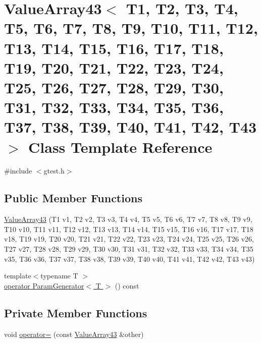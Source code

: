 \hypertarget{classtesting_1_1internal_1_1ValueArray43}{\section{\-Value\-Array43$<$ \-T1, \-T2, \-T3, \-T4, \-T5, \-T6, \-T7, \-T8, \-T9, \-T10, \-T11, \-T12, \-T13, \-T14, \-T15, \-T16, \-T17, \-T18, \-T19, \-T20, \-T21, \-T22, \-T23, \-T24, \-T25, \-T26, \-T27, \-T28, \-T29, \-T30, \-T31, \-T32, \-T33, \-T34, \-T35, \-T36, \-T37, \-T38, \-T39, \-T40, \-T41, \-T42, \-T43 $>$ \-Class \-Template \-Reference}
\label{d3/d15/classtesting_1_1internal_1_1ValueArray43}
}


{\ttfamily \#include $<$gtest.\-h$>$}

\subsection*{\-Public \-Member \-Functions}
\begin{DoxyCompactItemize}
\item 
\hyperlink{classtesting_1_1internal_1_1ValueArray43_a028ab5360d72df1378ef87a5a6cf0e61}{\-Value\-Array43} (\-T1 v1, \-T2 v2, \-T3 v3, \-T4 v4, \-T5 v5, \-T6 v6, \-T7 v7, \-T8 v8, \-T9 v9, \-T10 v10, \-T11 v11, \-T12 v12, \-T13 v13, \-T14 v14, \-T15 v15, \-T16 v16, \-T17 v17, \-T18 v18, \-T19 v19, \-T20 v20, \-T21 v21, \-T22 v22, \-T23 v23, \-T24 v24, \-T25 v25, \-T26 v26, \-T27 v27, \-T28 v28, \-T29 v29, \-T30 v30, \-T31 v31, \-T32 v32, \-T33 v33, \-T34 v34, \-T35 v35, \-T36 v36, \-T37 v37, \-T38 v38, \-T39 v39, \-T40 v40, \-T41 v41, \-T42 v42, \-T43 v43)
\item 
{\footnotesize template$<$typename T $>$ }\\\hyperlink{classtesting_1_1internal_1_1ValueArray43_a08ef46fa12c9dd8ef6fc630baeea89b7}{operator Param\-Generator$<$ T $>$} () const 
\end{DoxyCompactItemize}
\subsection*{\-Private \-Member \-Functions}
\begin{DoxyCompactItemize}
\item 
void \hyperlink{classtesting_1_1internal_1_1ValueArray43_a76f80387e5e73a6357abdb09cd64b408}{operator=} (const \hyperlink{classtesting_1_1internal_1_1ValueArray43}{\-Value\-Array43} \&other)
\end{DoxyCompactItemize}
